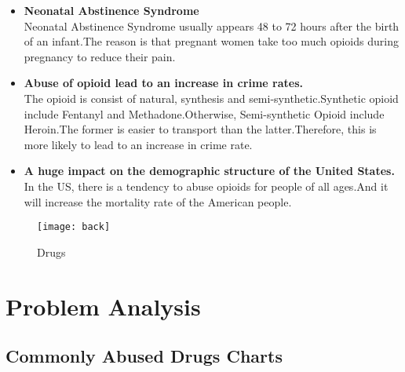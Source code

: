 \documentclass{mcmthesis}
\begin{document}
\begin{itemize}
	\item \textbf{Neonatal Abstinence Syndrome} \\%
	Neonatal Abstinence Syndrome usually appears 48 to 72 hours after the birth of an infant.The reason is that pregnant women take too much opioids during pregnancy to reduce their pain. \\
	\item \textbf{Abuse of opioid lead to an increase in crime rates.} \\
	The opioid is consist of natural, synthesis and semi-synthetic.Synthetic opioid include Fentanyl and Methadone.Otherwise, Semi-synthetic Opioid include Heroin.The former is easier to transport than the latter.Therefore, this is more likely to lead to an increase in crime rate. \\
	\item \textbf{A huge impact on the demographic structure of the United States.} \\ %
	In the US, there is a tendency to abuse opioids for people of all ages.And it will increase the mortality rate of the American people.
\end{itemize}
\begin{figure}[!h]
	\small
	\centering
	\texttt{[image: back]}
	\caption{Drugs} \label{fig:aa}
\end{figure}
\newpage %

\section{Problem Analysis} 

\subsection{Commonly Abused Drugs Charts }%
\end{document}

